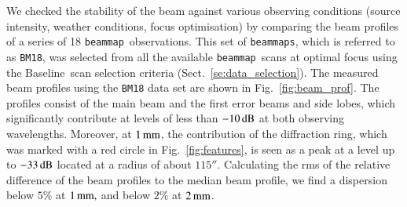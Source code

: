 \documentclass[traditionalabstract]{aa}
\newcommand{\bm}{{\tt beammap}}
\newcommand{\bms}{{\tt beammaps}}
\newcommand{\baseline}{Baseline}%
\newcommand{\lp}[1]{#1}
\begin{document}
{We checked the stability of the beam against various
observing conditions (source intensity, weather conditions, focus
optimisation) by comparing the beam profiles of a series of 18 \bm\
observations.
This set of \bms, which is referred to as {\tt BM18}, was
selected from all the available \bm\ scans at optimal focus using the
\baseline\ scan selection criteria (Sect.~\ref{se:data_selection}).
The measured beam profiles using the {\tt BM18} data set are shown in
Fig.~\ref{fig:beam_prof}. {\lp The profiles consist of the main beam and
the first error beams and side lobes, which significantly contribute
at levels of less than $-10\,\rm{dB}$ at both observing
wavelengths. Moreover, at $1\,\rm{mm}$, the contribution of the
diffraction ring, which was marked with a red circle in Fig.~\ref{fig:features},
is seen as a peak at a level up to $-33\,\rm{dB}$ located at a radius
of about $115''$.} Calculating the {\lp rms of the relative}
difference of the beam profiles to the median beam profile, we find a
dispersion below $5\%$ at $1\,\rm{mm,}$ and below $2\%$ at
$2\,\rm{mm}$.

}
\end{document}
